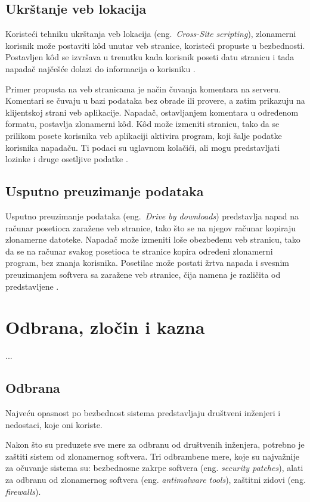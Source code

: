 \documentclass[a4paper]{article}
\begin{document}
\subsection{Ukrštanje veb lokacija}

Koristeći tehniku ukrštanja veb lokacija (eng.~{\em Cross-Site scripting}), zlonamerni korisnik može postaviti kôd unutar veb stranice, koristeći propuste u bezbednosti. Postavljen kôd se izvršava u trenutku kada korisnik poseti datu stranicu i tada napadač najčešće dolazi do informacija o korisniku \cite{ethics,xss}.

Primer propusta na veb stranicama je način čuvanja komentara na serveru. Komentari se čuvaju u bazi podataka bez obrade ili provere, a zatim prikazuju na klijentskoj strani veb aplikacije. Napadač, ostavljanjem komentara u određenom formatu, postavlja zlonamerni kôd. Kôd može izmeniti stranicu, tako da se prilikom posete korisnika veb aplikaciji aktivira program, koji šalje podatke korisnika napadaču. Ti podaci su uglavnom kolačići, ali mogu predstavljati lozinke i druge osetljive podatke \cite{xss}.

\subsection{Usputno preuzimanje podataka }

Usputno preuzimanje podataka (eng.~{\em Drive by downloads}) predstavlja napad na računar posetioca zaražene veb stranice, tako što se na njegov računar kopiraju zlonamerne datoteke. Napadač može izmeniti loše obezbeđenu veb stranicu, tako da se na računar svakog posetioca te stranice kopira određeni zlonamerni program, bez znanja korisnika. Posetilac može postati žrtva napada i svesnim preuzimanjem softvera sa zaražene veb stranice, čija namena je različita od predstavljene \cite{drivebydownloads, ethics}.

\section{Odbrana, zločin i kazna}

...

\subsection{Odbrana}

Najveću opasnost po bezbednost sistema predstavljaju društveni inženjeri i nedostaci, koje oni koriste. 

Nakon što su preduzete sve mere za odbranu od društvenih inženjera, potrebno je zaštiti sistem od zlonamernog softvera. Tri odbrambene mere, koje su najvažnije za očuvanje sistema su: bezbednosne zakrpe softvera (eng. \textit{security patches}), alati za odbranu od zlonamernog softvera (eng. \textit{antimalware tools}), zaštitni zidovi (eng. \textit{firewalls}).
\end{document}
